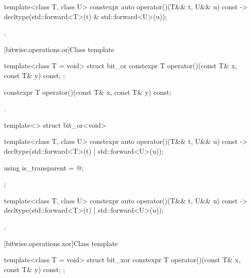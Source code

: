 %
\begin{itemdecl}
template<class T, class U> constexpr auto operator()(T&& t, U&& u) const
    -> decltype(std::forward<T>(t) & std::forward<U>(u));
\end{itemdecl}

\begin{itemdescr}
\pnum
\returns
{}.
\end{itemdescr}

[bitwise.operations.or]{Class template }

%
\begin{itemdecl}
template<class T = void> struct bit_or {
  constexpr T operator()(const T& x, const T& y) const;
};
\end{itemdecl}

%
\begin{itemdecl}
constexpr T operator()(const T& x, const T& y) const;
\end{itemdecl}

\begin{itemdescr}
\pnum
\returns
{}.
\end{itemdescr}

%
\begin{itemdecl}
template<> struct bit_or<void> {
  template<class T, class U> constexpr auto operator()(T&& t, U&& u) const
    -> decltype(std::forward<T>(t) | std::forward<U>(u));

  using is_transparent = @\unspec@;
};
\end{itemdecl}

%
\begin{itemdecl}
template<class T, class U> constexpr auto operator()(T&& t, U&& u) const
    -> decltype(std::forward<T>(t) | std::forward<U>(u));
\end{itemdecl}

\begin{itemdescr}
\pnum
\returns
{}.
\end{itemdescr}

[bitwise.operations.xor]{Class template }

%
\begin{itemdecl}
template<class T = void> struct bit_xor {
  constexpr T operator()(const T& x, const T& y) const;
};
\end{itemdecl}

